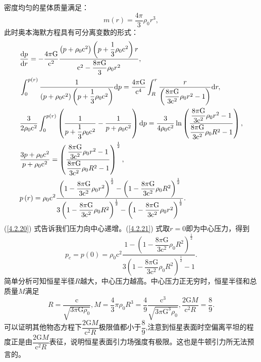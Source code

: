 \documentclass[11pt, a4paper, oneside, onecolumn]{ctexart}
\numberwithin{equation}{subsection}
\begin{document}
密度均匀的星体质量满足：
\begin{equation}
m\left(r\right)=\frac{4\pi}{3}\rho_{0}r^{3},\label{4.2.19}
\end{equation}
此时奥本海默方程具有可分离变数的形式：
\begin{align}
&\frac{\mathrm{d}p}{\mathrm{d}r}=-\frac{4\pi\mathrm{G}}{\mathrm{c}^{2}}\frac{\left(p+\rho_{0}\mathrm{c}^{2}\right)\left(p+\dfrac{1}{3}\rho_{0}\mathrm{c}^{2}\right)r}{\mathrm{c}^{2}-\dfrac{8\pi\mathrm{G}}{3}\rho_{0}r^{2}},\label{4.2.20}\\
&\int_{0}^{p\left(r\right)}\frac{1}{\left(p+\rho_{0}\mathrm{c}^{2}\right)\left(p+\dfrac{1}{3}\rho_{0}\mathrm{c}^{2}\right)}\mathrm{d}p=\frac{4\pi\mathrm{G}}{\mathrm{c}^{4}}\int_{R}^{r}\frac{r}{\left(\dfrac{8\pi\mathrm{G}}{3\mathrm{c}^{2}}\rho_{0}r^{2}-1\right)}\mathrm{d}r,\notag\\
&\frac{3}{2\rho_{0}\mathrm{c}^{2}}\int_{0}^{p\left(r\right)}\left(\frac{1}{p+\dfrac{1}{3}\rho_{0}\mathrm{c}^{2}}-\frac{1}{p+\rho_{0}\mathrm{c}^{2}}\right)\mathrm{d}p=\frac{3}{4\rho_{0}\mathrm{c}^{2}}\ln\left(\frac{\dfrac{8\pi\mathrm{G}}{3\mathrm{c}^{2}}\rho_{0}r^{2}-1}{\dfrac{8\pi\mathrm{G}}{3\mathrm{c}^{2}}\rho_{0}R^{2}-1}\right),\notag\\
&\frac{3p+\rho_{0}\mathrm{c}^{2}}{p+\rho_{0}\mathrm{c}^{2}}=\left(\frac{\dfrac{8\pi\mathrm{G}}{3\mathrm{c}^{2}}\rho_{0}r^{2}-1}{\dfrac{8\pi\mathrm{G}}{3\mathrm{c}^{2}}\rho_{0}R^{2}-1}\right)^{\frac{1}{2}},\notag\\
&p\left(r\right)=\rho_{0}\mathrm{c}^{2}\frac{\left(1-\dfrac{8\pi\mathrm{G}}{3\mathrm{c}^{2}}\rho_{0}r^{2}\right)^{\frac{1}{2}}-\left(1-\dfrac{8\pi\mathrm{G}}{3\mathrm{c}^{2}}\rho_{0}R^{2}\right)^{\frac12}}{3\left(1-\dfrac{8\pi\mathrm{G}}{3\mathrm{c}^{2}}\rho_{0}R^{2}\right)^{\frac12}-\left(1-\dfrac{8\pi\mathrm{G}}{3\mathrm{c}^{2}}\rho_{0}r^{2}\right)^{\frac{1}{2}}}.\label{4.2.21}
\end{align}
(\ref{4.2.20}) 式告诉我们压力向中心递增。(\ref{4.2.21}) 式取$r=0$即为中心压力，得到
\begin{equation}
p_{c}=p\left(0\right)=\rho_{0}\mathrm{c}^{2}\frac{1-\left(1-\dfrac{8\pi\mathrm{G}}{3\mathrm{c}^{2}}\rho_{0}R^{2}\right)^{\frac12}}{3\left(1-\dfrac{8\pi\mathrm{G}}{3\mathrm{c}^{2}}\rho_{0}R^{2}\right)^{\frac12}-1}.
\end{equation}
简单分析可知恒星半径$R$越大，中心压力越高。中心压力正无穷时，恒星半径和总质量$M$满足
\begin{equation}
R=\frac{\mathrm{c}}{\sqrt{3\pi\mathrm{G}\rho_{0}}},M=\frac{4}{3}\pi \rho_{0}R^{3}=\frac{4}{9}\frac{\mathrm{c}^{3}}{\sqrt{3\pi\mathrm{G}^{3}\rho_{0}}},\frac{2\mathrm{G}M}{\mathrm{c}^{2}R}=\frac{8}{9}.
\end{equation}
可以证明其他物态方程下$\dfrac{2\mathrm{G}M}{\mathrm{c}^{2}R}$极限值都小于$\dfrac{8}{9}$,注意到恒星表面时空偏离平坦的程度正是由$\dfrac{2\mathrm{G}M}{\mathrm{c}^{2}R}$表征，说明恒星表面引力场强度有极限。这也是牛顿引力所无法预言的。
\end{document}
